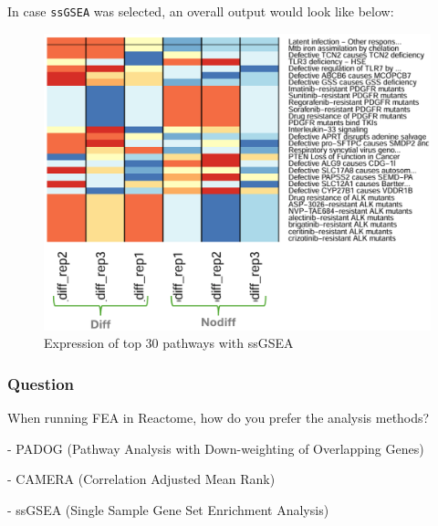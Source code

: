 \documentclass[
]{book}
\begin{document}
In case \texttt{ssGSEA} was selected, an overall output would look like below:

\begin{figure}

{\centering \includegraphics[width=0.7\linewidth]{images/reactome-ssGSEA} 

}

\caption{Expression of top 30 pathways with ssGSEA}\label{fig:unnamed-chunk-34}
\end{figure}

\hypertarget{section-5}{%
\subsubsection*{}\label{section-5}}

\hypertarget{question-3}{%
\subsubsection*{\texorpdfstring{\textbf{Question }}{Question }}\label{question-3}}

When running FEA in Reactome, how do you prefer the analysis methods?

- PADOG (Pathway Analysis with Down-weighting of Overlapping Genes)

- CAMERA (Correlation Adjusted Mean Rank)

- ssGSEA (Single Sample Gene Set Enrichment Analysis)

\hypertarget{section-6}{%
\subsubsection*{}\label{section-6}}
\end{document}
